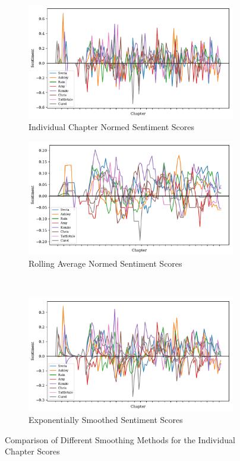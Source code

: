 \documentclass[11pt]{article}
\begin{document}
\begin{figure}[H]
\centering
\begin{subfigure}[t]{0.485\textwidth}
\centering
\includegraphics[width=\textwidth]{Full Graphs v2/ind_sent_scores.pdf}
\caption{Individual Chapter Normed Sentiment Scores}
\label{smooth_compare_1}
\end{subfigure}

\begin{subfigure}[t]{0.485\textwidth}
\centering
\includegraphics[width=\textwidth]{Full Graphs v2/mean_smoothed_sent_scores.pdf}
\caption{Rolling Average Normed Sentiment Scores}
\label{smooth_compare_2}
\end{subfigure}
~
\begin{subfigure}[t]{0.485\textwidth}
\centering
\includegraphics[width=\textwidth]{Full Graphs v2/exp_smooth_sent_scores.pdf}
\caption{Exponentially Smoothed Sentiment Scores}
\label{smooth_compare_3}
\end{subfigure}
\label{smoothing_comparison}
\caption{Comparison of Different Smoothing Methods for the Individual Chapter Scores}
\end{figure}
\end{document}
